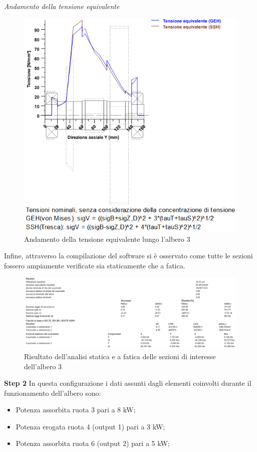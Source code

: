 \emph{Andamento della tensione equivalente}
\begin{figure}[h]
    \centering
    \includegraphics[scale=0.5]{Immagini/Tensioni1Albero3.png}
    \caption{Andamento della tensione equivalente lungo l'albero 3}
    \label{fig:Tensioni1Albero3}
\end{figure}
\newpage
Infine, attraverso la compilazione del software si è osservato come tutte le sezioni fossero ampiamente verificate sia staticamente che a fatica.
\begin{figure}[h]
    \centering
    \includegraphics[scale=0.4]{Immagini/Risultati1Albero3.png}
    \caption{Risultato dell'analisi statica e a fatica delle sezioni di interesse dell'albero 3}
    \label{fig:Risultati1Albero3}
\end{figure}

\textbf{Step 2}
In questa configurazione i dati assunti dagli elementi coinvolti durante il funzionamento dell'albero sono:
\begin{itemize}
    \item Potenza assorbita ruota 3 pari a 8 kW;
    \item Potenza erogata ruota 4 (output 1) pari a 3 kW;
    \item Potenza assorbita ruota 6 (output 2) pari a 5 kW;
\end{itemize}

